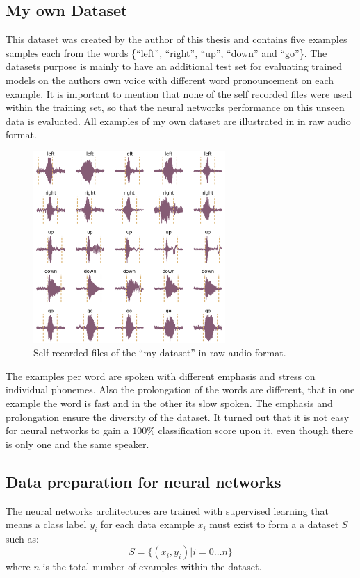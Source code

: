 \subsection{My own Dataset}\label{sec:exp_dataset_my}
This dataset was created by the author of this thesis and contains five examples samples each from the words \{\enquote{left}, \enquote{right}, \enquote{up}, \enquote{down} and \enquote{go}\}.
The datasets purpose is mainly to have an additional test set for evaluating trained models on the authors own voice with different word pronouncement on each example.
It is important to mention that none of the self recorded files were used within the training set, so that the neural networks performance on this unseen data is evaluated.
All examples of my own dataset are illustrated in  in raw audio format.
\begin{figure}[!ht]
  \centering
    \includegraphics[width=0.65\textwidth]{./5_exp/figs/exp_dataset_wav_grid_my}
  \caption{Self recorded files of the \enquote{my dataset} in raw audio format.}
  \label{fig:exp_dataset_wav_grid_my}
\end{figure}
\FloatBarrier
\noindent
The examples per word are spoken with different emphasis and stress on individual phonemes.
Also the prolongation of the words are different, that in one example the word is fast and in the other its slow spoken.
The emphasis and prolongation ensure the diversity of the dataset. 
It turned out that it is not easy for neural networks to gain a $100\%$ classification score upon it, even though there is only one and the same speaker.



\subsection{Data preparation for neural networks}\label{sec:exp_data_prep}
The neural networks architectures are trained with supervised learning that means a class label $y_i$ for each data example $x_i$ must exist to form a a dataset $S$ such as:
\begin{equation}\label{eq:exp_dataset}
  S = \{ (x_i, y_i) | i = 0 \dots n \}
\end{equation}
where $n$ is the total number of examples within the dataset.

